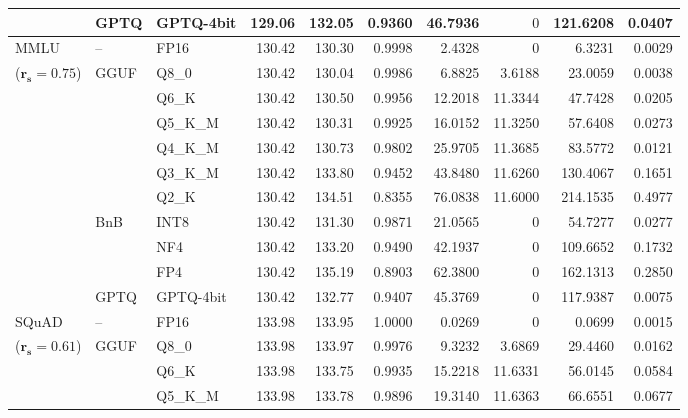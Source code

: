 \begin{longtable}{ll l rrrrrrr}
 & GPTQ & GPTQ-4bit & 129.06 & 132.05 & \cellcolor{red!18} 0.9360 & \cellcolor{red!18} 46.7936 & \cellcolor{cyan!12} $0$ & \cellcolor{red!18} 121.6208 & \cellcolor{red!18} 0.0407 \\
\midrule
MMLU & -- & FP16 & 130.42 & 130.30 & 0.9998 & 2.4328 & \cellcolor{cyan!12} $0$ & 6.3231 & 0.0029 \\
{\small ($\mathbf{r_s{=}0.75}$)} & GGUF & Q8\_0 & 130.42 & 130.04 & 0.9986 & 6.8825 & 3.6188 & 23.0059 & 0.0038 \\
 &  & Q6\_K & 130.42 & 130.50 & 0.9956 & 12.2018 & 11.3344 & 47.7428 & 0.0205 \\
 &  & Q5\_K\_M & 130.42 & 130.31 & 0.9925 & 16.0152 & 11.3250 & 57.6408 & 0.0273 \\
 &  & Q4\_K\_M & 130.42 & 130.73 & 0.9802 & 25.9705 & 11.3685 & 83.5772 & 0.0121 \\
 &  & Q3\_K\_M & 130.42 & 133.80 & \cellcolor{red!18} 0.9452 & \cellcolor{red!18} 43.8480 & 11.6260 & \cellcolor{red!18} 130.4067 & \cellcolor{red!18} 0.1651 \\
 &  & Q2\_K & 130.42 & 134.51 & \cellcolor{red!18} 0.8355 & \cellcolor{red!18} 76.0838 & 11.6000 & \cellcolor{red!18} 214.1535 & \cellcolor{red!18} 0.4977 \\
 & BnB & INT8 & 130.42 & 131.30 & 0.9871 & 21.0565 & \cellcolor{cyan!12} $0$ & 54.7277 & 0.0277 \\
 &  & NF4 & 130.42 & 133.20 & \cellcolor{red!18} 0.9490 & \cellcolor{red!18} 42.1937 & \cellcolor{cyan!12} $0$ & \cellcolor{red!18} 109.6652 & \cellcolor{red!18} 0.1732 \\
 &  & FP4 & 130.42 & 135.19 & \cellcolor{red!18} 0.8903 & \cellcolor{red!18} 62.3800 & \cellcolor{cyan!12} $0$ & \cellcolor{red!18} 162.1313 & \cellcolor{red!18} 0.2850 \\
 & GPTQ & GPTQ-4bit & 130.42 & 132.77 & \cellcolor{red!18} 0.9407 & \cellcolor{red!18} 45.3769 & \cellcolor{cyan!12} $0$ & \cellcolor{red!18} 117.9387 & \cellcolor{red!18} 0.0075 \\
\midrule
SQuAD & -- & FP16 & 133.98 & 133.95 & 1.0000 & 0.0269 & \cellcolor{cyan!12} $0$ & 0.0699 & 0.0015 \\
{\small ($\mathbf{r_s{=}0.61}$)} & GGUF & Q8\_0 & 133.98 & 133.97 & 0.9976 & 9.3232 & 3.6869 & 29.4460 & 0.0162 \\
 &  & Q6\_K & 133.98 & 133.75 & 0.9935 & 15.2218 & 11.6331 & 56.0145 & 0.0584 \\
 &  & Q5\_K\_M & 133.98 & 133.78 & 0.9896 & 19.3140 & 11.6363 & 66.6551 & 0.0677 \\

\end{longtable}
